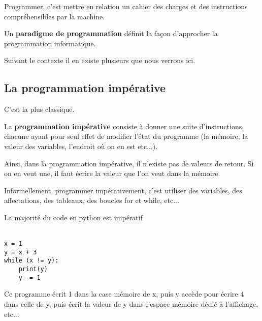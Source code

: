 
Programmer, c'est mettre en relation un cahier des charges et des instructions compréhensibles par la machine.
\begin{definition}
	Un \textbf{paradigme de programmation} définit la façon d'approcher la programmation informatique.
\end{definition}

Suivant le contexte il en existe plusieurs que nous verrons ici.


\subsection{La programmation impérative}

C'est la plus classique.

\begin{definition}
	La \textbf{programmation impérative} consiste à donner une suite d'instructions, chacune ayant pour seul effet de modifier l'état du programme (la mémoire, la valeur des variables, l'endroit où on en est etc...).
\end{definition}

\begin{rem}
	Ainsi, dans la programmation impérative, il n'existe pas de valeurs de retour. Si on en veut une, il faut écrire la valeur que l'on veut dans la mémoire.
\end{rem}

\begin{rem}
	Informellement, programmer impérativement, c'est utiliser des variables, des affectations, des tableaux, des boucles for et while, etc...
\end{rem}

\begin{example}
	La majorité du code en python est impératif\\\\
	\begin{minipage}{0.2\linewidth}
		\begin{lstlisting}
x = 1
y = x + 3
while (x != y):
    print(y)
    y -= 1
		\end{lstlisting}
	\end{minipage} \quad \begin{minipage}{0.75 \linewidth}
		Ce programme écrit 1 dans la case mémoire de x, puis y accède pour écrire 4 dans celle de y, puis écrit la valeur de y dans l'espace mémoire dédié à l'affichage, etc...
	\end{minipage}
\end{example}

